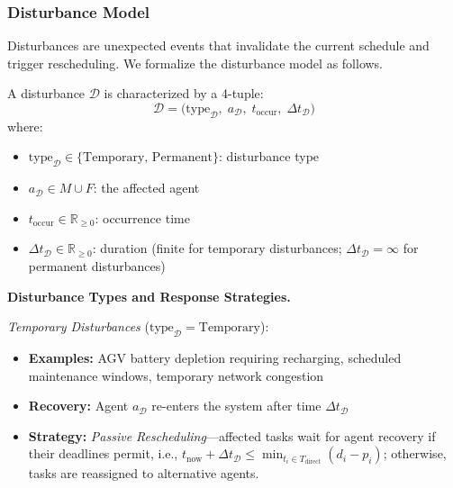 \documentclass[manuscript,screen,review]{acmart}
\begin{document}
\subsubsection{Disturbance Model}

Disturbances are unexpected events that invalidate the current schedule and trigger
rescheduling. We formalize the disturbance model as follows.

\begin{definition}[Disturbance]
\label{def:disturbance}
A disturbance $\mathcal{D}$ is characterized by a 4-tuple:
\begin{equation}
    \mathcal{D} = \bigl(\mathrm{type}_{\mathcal{D}},\;
                         a_{\mathcal{D}},\;
                         t_{\mathrm{occur}},\;
                         \Delta t_{\mathcal{D}}\bigr)
    \label{eq:disturbance}
\end{equation}
where:
\begin{itemize}[leftmargin=*, nosep]
    \item $\mathrm{type}_{\mathcal{D}} \in \{\mathrm{Temporary},\,
          \mathrm{Permanent}\}$: disturbance type
    \item $a_{\mathcal{D}} \in M \cup F$: the affected agent
    \item $t_{\mathrm{occur}} \in \mathbb{R}_{\geq 0}$: occurrence time
    \item $\Delta t_{\mathcal{D}} \in \mathbb{R}_{\geq 0}$: duration
          (finite for temporary disturbances; $\Delta t_{\mathcal{D}} = \infty$
          for permanent disturbances)
\end{itemize}
\end{definition}

\textbf{Disturbance Types and Response Strategies.}

\textit{Temporary Disturbances} ($\mathrm{type}_{\mathcal{D}} = \mathrm{Temporary}$):
\begin{itemize}[leftmargin=*, nosep]
    \item \textbf{Examples:} AGV battery depletion requiring recharging,
          scheduled maintenance windows, temporary network congestion
    \item \textbf{Recovery:} Agent $a_{\mathcal{D}}$ re-enters the system after
          time $\Delta t_{\mathcal{D}}$
	\item \textbf{Strategy:} \textit{Passive Rescheduling}---affected tasks wait
			  for agent recovery if their deadlines permit, i.e.,
			  $t_{\mathrm{now}} + \Delta t_{\mathcal{D}} \leq \min_{t_i \in T_{\mathrm{direct}}}(d_i - p_i)$;
			  otherwise, tasks are reassigned to alternative agents.
\end{itemize}
\end{document}
